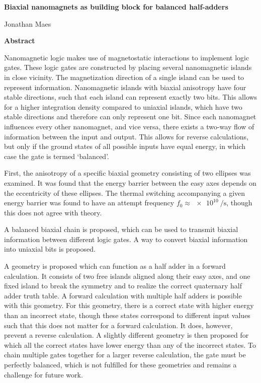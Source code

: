 \documentclass[11pt,a4paper,english]{article}
\begin{document}
\clearpage
\begin{center}
    \Large
    \textbf{Biaxial nanomagnets as building block for balanced half-adders}

    \large
    \vspace{0.4cm}
    Jonathan Maes
       
    \vspace{0.9cm}
    \textbf{Abstract}
\end{center}
Nanomagnetic logic makes use of magnetostatic interactions to implement logic gates. These logic gates are constructed by placing several nanomagnetic islands in close vicinity. The magnetization direction of a single island can be used to represent information. Nanomagnetic islands with biaxial anisotropy have four stable directions, such that each island can represent exactly two bits. This allows for a higher integration density compared to uniaxial islands, which have two stable directions and therefore can only represent one bit. Since each nanomagnet influences every other nanomagnet, and vice versa, there exists a two-way flow of information between the input and output. This allows for reverse calculations, but only if the ground states of all possible inputs have equal energy, in which case the gate is termed `balanced'. \par
First, the anisotropy of a specific biaxial geometry consisting of two ellipses was examined. It was found that the energy barrier between the easy axes depends on the eccentricity of these ellipses. The thermal switching accompanying a given energy barrier was found to have an attempt frequency $f_0 \approx \SI{e10}{\per\second}$, though this does not agree with theory. \par
A balanced biaxial chain is proposed, which can be used to transmit biaxial information between different logic gates. A way to convert biaxial information into uniaxial bits is proposed. \par
A geometry is proposed which can function as a half adder in a forward calculation. It consists of two free islands aligned along their easy axes, and one fixed island to break the symmetry and to realize the correct quaternary half adder truth table. A forward calculation with multiple half adders is possible with this geometry. For this geometry, there is a correct state with higher energy than an incorrect state, though these states correspond to different input values such that this does not matter for a forward calculation. It does, however, prevent a reverse calculation. A slightly different geometry is then proposed for which all the correct states have lower energy than any of the incorrect states. To chain multiple gates together for a larger reverse calculation, the gate must be perfectly balanced, which is not fulfilled for these geometries and remains a challenge for future work.
\end{document}
